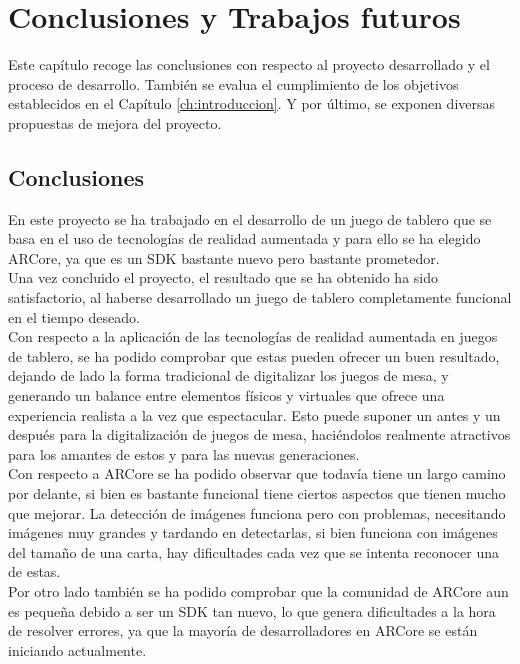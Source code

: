 \chapter{Conclusiones y Trabajos futuros}
\label{ch:conclusiones}
Este capítulo recoge las conclusiones con respecto al proyecto desarrollado y el proceso de desarrollo. También se evalua el cumplimiento de los objetivos establecidos en el Capítulo \ref{ch:introduccion}. Y por último, se exponen diversas propuestas de mejora del proyecto.

\section{Conclusiones}
En este proyecto se ha trabajado en el desarrollo de un juego de tablero que se basa en el uso de tecnologías de realidad aumentada
y para ello se ha elegido ARCore, ya que es un SDK bastante nuevo pero bastante prometedor.\\

Una vez concluido el proyecto, el resultado que se ha obtenido ha sido satisfactorio, al haberse desarrollado un juego de tablero completamente funcional en el tiempo deseado.\\

Con respecto a la aplicación de las tecnologías de realidad aumentada en juegos de tablero, se ha podido comprobar que estas pueden ofrecer un buen resultado, dejando de lado la forma tradicional de digitalizar los juegos de mesa, y generando un balance entre elementos físicos y virtuales que ofrece una experiencia realista a la vez que espectacular. Esto puede suponer un antes y un después para la digitalización de juegos de mesa, haciéndolos realmente atractivos para los amantes de estos y para las nuevas generaciones.\\

Con respecto a ARCore se ha podido observar que todavía tiene un largo camino por delante, si bien es bastante funcional tiene ciertos aspectos que tienen mucho que mejorar. La detección de imágenes funciona pero con problemas, necesitando imágenes muy grandes y tardando en detectarlas, si bien funciona con imágenes del tamaño de una carta, hay dificultades cada vez que se intenta reconocer una de estas.\\

Por otro lado también se ha podido comprobar que la comunidad de ARCore aun es pequeña debido a ser un SDK tan nuevo, lo que genera dificultades a la hora de resolver errores, ya que la mayoría de desarrolladores en ARCore se están iniciando actualmente.\\

